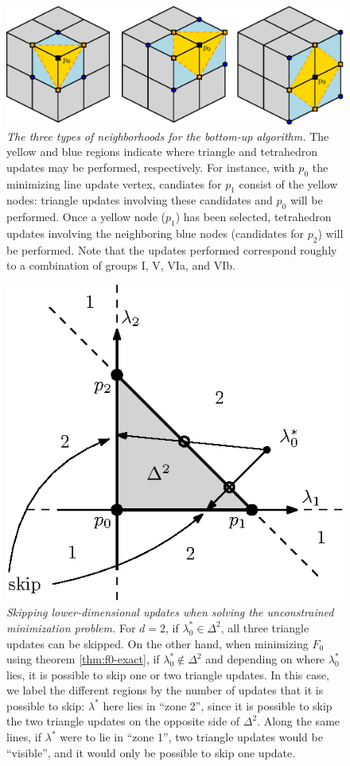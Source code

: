 \documentclass[smallcondensed]{svjour3}
\begin{document}
\begin{figure}[t]
  \centering
  \includegraphics[width=0.85\linewidth]{hu-neighborhoods.eps}
  \caption{\emph{The three types of neighborhoods for the
      \emph{bottom-up} algorithm.} The yellow and blue regions
    indicate where triangle and tetrahedron updates may be performed,
    respectively. For instance, with $p_0$ the minimizing line update
    vertex, candiates for $p_1$ consist of the yellow nodes: triangle
    updates involving these candidates and $p_0$ will be
    performed. Once a yellow node ($p_1$) has been selected,
    tetrahedron updates involving the neighboring blue nodes
    (candidates for $p_2$) will be performed. Note that the updates
    performed correspond roughly to a combination of groups I, V, VIa,
    and VIb.}\label{fig:hu-neighborhoods}
\end{figure}

\begin{figure}
  \centering
  \includegraphics[width=0.4\linewidth]{skip-zones.eps}
  \caption{\emph{Skipping lower-dimensional updates when solving the
      unconstrained minimization problem.} For $d = 2$, if
    $\lambda_0^* \in \Delta^2$, all three triangle updates can be
    skipped. On the other hand, when minimizing $F_0$ using theorem
    \ref{thm:f0-exact}, if $\lambda^*_0 \notin \Delta^2$ and depending
    on where $\lambda_0^*$ lies, it is possible to skip one or two
    triangle updates. In this case, we label the different regions by
    the number of updates that it is possible to skip: $\lambda^*$
    here lies in ``zone 2'', since it is possible to skip the two
    triangle updates on the opposite side of $\Delta^2$. Along the
    same lines, if $\lambda^*$ were to lie in ``zone 1'', two triangle
    updates would be ``visible'', and it would only be possible to
    skip one update.}\label{fig:skip-zones}
\end{figure}
\end{document}
